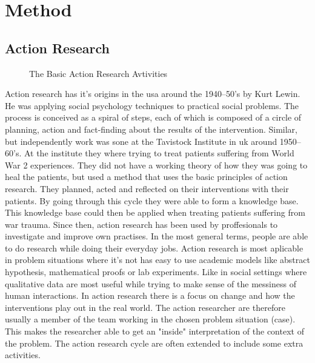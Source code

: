 \chapter{Method}
\section{Action Research}	
\begin{figure}
\centering
\caption{The Basic Action Research Avtivities}
\label{fig:basicactivity}
\end{figure}
Action research has it's origins in the \gls{usa} around the 1940--50's by Kurt Lewin.
He was applying social psychology techniques to practical social problems. 
The process is conceived as a spiral of steps, each of which is composed of a circle of planning, action and fact-finding about the results of the intervention.
Similar, but independently work was sone at the Tavistock Institute in \gls{uk} around 1950--60's.
At the institute they where trying to treat patients suffering from World War 2 experiences. 
They did not have a working theory of how they was going to heal the patients, but used a method that uses the basic principles of action research.
They planned, acted and reflected on their interventions with their patients. 
By going through this cycle they were able to form a knowledge base.
This knowledge base could then be applied when treating patients suffering from war trauma.
Since then, action research has been used by proffesionals to investigate and improve own practises.
In the most general terms, people are able to do research while doing their everyday jobs.
Action research is most aplicable in problem situations where it's not has easy to use academic models like abstract hypothesis, mathematical proofs or lab experiments. Like in social settings where qualitative data are most useful while trying to make sense of the messiness of human interactions.
In action research there is a focus on change and how the interventions play out in the real world.
The action researcher are therefore usually a member of the team working in the chosen problem situation (case).
This makes the researcher able to get an "inside" interpretation of the context of the problem.
The action research cycle are often extended to include some extra activities. 
